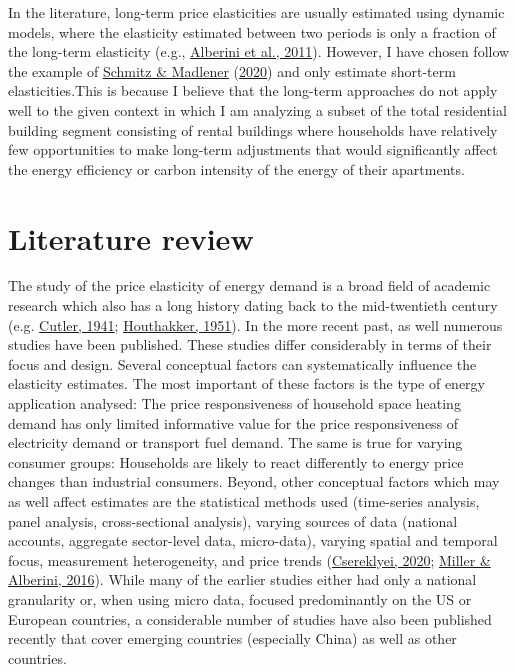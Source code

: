 \documentclass[12pt,twoside]{reedthesis}
\begin{document}
In the literature, long-term price elasticities are usually estimated using dynamic models, where the elasticity estimated between two periods is only a fraction of the long-term elasticity (e.g., \protect\hyperlink{ref-alberini_etal11}{Alberini et al., 2011}). However, I have chosen follow the example of \protect\hyperlink{ref-schmitz_madlener20}{Schmitz \& Madlener} (\protect\hyperlink{ref-schmitz_madlener20}{2020}) and only estimate short-term elasticities.This is because I believe that the long-term approaches do not apply well to the given context in which I am analyzing a subset of the total residential building segment consisting of rental buildings where households have relatively few opportunities to make long-term adjustments that would significantly affect the energy efficiency or carbon intensity of the energy of their apartments.

\hypertarget{review}{%
\section{Literature review}\label{review}}

The study of the price elasticity of energy demand is a broad field of academic research which also has a long history dating back to the mid-twentieth century (e.g. \protect\hyperlink{ref-cutler41}{Cutler, 1941}; \protect\hyperlink{ref-houthakker51}{Houthakker, 1951}). In the more recent past, as well numerous studies have been published. These studies differ considerably in terms of their focus and design. Several conceptual factors can systematically influence the elasticity estimates. The most important of these factors is the type of energy application analysed: The price responsiveness of household space heating demand has only limited informative value for the price responsiveness of electricity demand or transport fuel demand. The same is true for varying consumer groups: Households are likely to react differently to energy price changes than industrial consumers. Beyond, other conceptual factors which may as well affect estimates are the statistical methods used (time-series analysis, panel analysis, cross-sectional analysis), varying sources of data (national accounts, aggregate sector-level data, micro-data), varying spatial and temporal focus, measurement heterogeneity, and price trends (\protect\hyperlink{ref-csereklyei20}{Csereklyei, 2020}; \protect\hyperlink{ref-miller_alberini16}{Miller \& Alberini, 2016}). While many of the earlier studies either had only a national granularity or, when using micro data, focused predominantly on the US or European countries, a considerable number of studies have also been published recently that cover emerging countries (especially China) as well as other countries.
\end{document}
